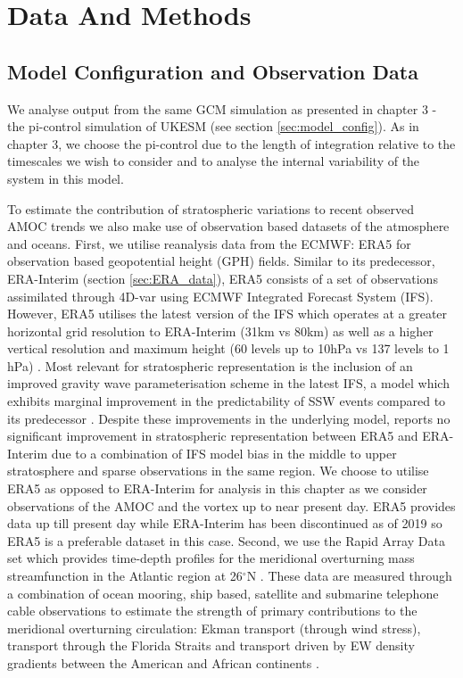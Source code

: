 \section{Data And Methods}
\subsection{Model Configuration and Observation Data}

We analyse output from the same GCM simulation as presented in chapter 3 - the pi-control simulation of UKESM (see section \ref{sec:model_config}). As in chapter 3, we choose the pi-control due to the length of integration relative to the timescales we wish to consider and to analyse the internal variability of the system in this model. 

To estimate the contribution of stratospheric variations to recent observed AMOC trends we also make use of observation based datasets of the atmosphere and oceans. First, we utilise reanalysis data from the ECMWF: ERA5 \citep{hersbachERA52020c} for observation based geopotential height (GPH) fields. Similar to its predecessor, ERA-Interim (section \ref{sec:ERA_data}), ERA5 consists of a set of observations assimilated through 4D-var using ECMWF Integrated Forecast System (IFS). However, ERA5 utilises the latest version of the IFS which operates at a greater horizontal grid resolution to ERA-Interim (31km vs 80km) as well as a higher vertical resolution and maximum height (60 levels up to 10hPa vs 137 levels to 1 hPa) \citep{hersbachERA52020c}. Most relevant for stratospheric representation is the inclusion of an improved gravity wave parameterisation scheme in the latest IFS, a model which exhibits marginal improvement in the predictability of SSW events compared to its predecessor \citep{orrImproved2010a}. Despite these improvements in the underlying model, \cite{hersbachERA52020c} reports no significant improvement in stratospheric representation between ERA5 and ERA-Interim due to a combination of IFS model bias in the middle to upper stratosphere and sparse observations in the same region. We choose to utilise ERA5 as opposed to ERA-Interim for analysis in this chapter as we consider observations of the AMOC and the vortex up to near present day. ERA5 provides data up till present day while ERA-Interim has been discontinued as of 2019 so ERA5 is a preferable dataset in this case. 
Second, we use the Rapid Array Data set which provides time-depth profiles for the meridional overturning mass streamfunction in the Atlantic region at 26$^{\circ}$N \citep{moatAtlantic2020c}. These data are measured through a combination of ocean mooring, ship based, satellite and submarine telephone cable observations to estimate the strength of primary contributions to the meridional overturning circulation: Ekman transport (through wind stress), transport through the Florida Straits and transport driven by EW density gradients between the American and African continents \citep{mccarthyMeasuring2015b}.

